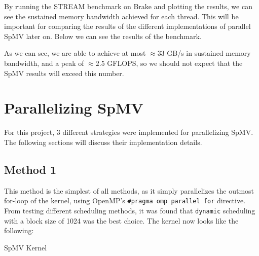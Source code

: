 \documentclass{article}
\begin{document}
    By running the STREAM benchmark on Brake and plotting the results, we can see the sustained memory bandwidth achieved for each thread. This will be important for comparing the results of the different implementations of parallel SpMV later on. Below we can see the results of the benchmark.


    As we can see, we are able to achieve at most \( \approx 33 \) GB/s in sustained memory bandwidth, and a peak of \( \approx 2.5 \) GFLOPS, so we should not expect that the SpMV results will exceed this number.


    \section{Parallelizing SpMV}

    For this project, 3 different strategies were implemented for parallelizing SpMV. The following sections will discuss their implementation details. 

    \subsection{Method 1}

    This method is the simplest of all methods, as it simply parallelizes the outmost for-loop of the kernel, using OpenMP's \texttt{\#pragma omp parallel for} directive. From testing different scheduling methods, it was found that \texttt{dynamic} scheduling with a block size of 1024 was the best choice. The kernel now looks like the following:
    \medskip


    \begin{algorithm}[H]
        \caption{SpMV Kernel}
        \SetAlgoVlined

    \end{algorithm}
\end{document}

